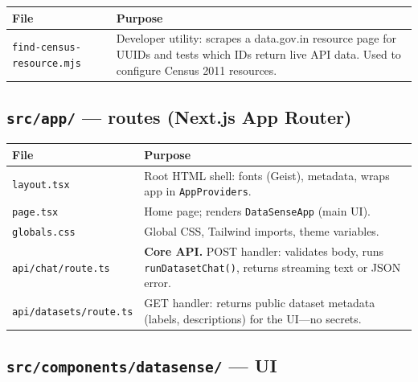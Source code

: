 \documentclass[11pt,a4paper]{article}
\begin{document}
\begin{longtable}{@{}p{4.2cm}p{9.8cm}@{}}
\toprule
\textbf{File} & \textbf{Purpose} \\
\midrule
\endhead
\texttt{find-census-resource.mjs} & Developer utility: scrapes a data.gov.in resource page for UUIDs and tests which IDs return live API data. Used to configure Census 2011 resources. \\
\bottomrule
\end{longtable}

\subsection{\texttt{src/app/} --- routes (Next.js App Router)}

\begin{longtable}{@{}p{4.2cm}p{9.8cm}@{}}
\toprule
\textbf{File} & \textbf{Purpose} \\
\midrule
\endhead
\texttt{layout.tsx} & Root HTML shell: fonts (Geist), metadata, wraps app in \texttt{AppProviders}. \\
\texttt{page.tsx} & Home page; renders \texttt{DataSenseApp} (main UI). \\
\texttt{globals.css} & Global CSS, Tailwind imports, theme variables. \\
\texttt{api/chat/route.ts} & \textbf{Core API.} POST handler: validates body, runs \texttt{runDatasetChat()}, returns streaming text or JSON error. \\
\texttt{api/datasets/route.ts} & GET handler: returns public dataset metadata (labels, descriptions) for the UI---no secrets. \\
\bottomrule
\end{longtable}

\subsection{\texttt{src/components/datasense/} --- UI}
\end{document}

